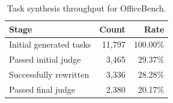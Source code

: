 \begin{table}[t]
\centering
\small
\begin{tabular}{lrr}
\toprule
\textbf{Stage} & \textbf{Count} & \textbf{Rate} \\
\midrule
Initial generated tasks & 11,797 & 100.00\% \\
Passed initial judge & 3,465 & 29.37\% \\
Successfully rewritten & 3,336 & 28.28\% \\
Passed final judge & 2,380 & 20.17\% \\
\bottomrule
\end{tabular}
\caption{Task synthesis throughput for OfficeBench.}
\label{tab:ob_task_synthesis_stats}
\end{table}
